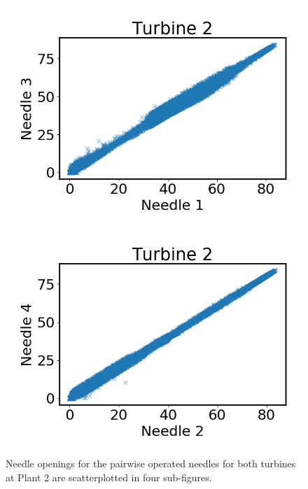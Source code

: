 \begin{figure}
\begin{minipage}[b]{0.5\linewidth}
                \includegraphics[width=\textwidth]{report/figures/data/p2_t2_n1_n3.png}
            \end{minipage}
            \begin{minipage}[b]{0.5\linewidth}
                \centering
                \includegraphics[width=\textwidth]{report/figures/data/p2_t2_n2_n4.png}
            \end{minipage}
            \caption{Needle openings for the pairwise operated needles for both turbines at Plant 2 are scatterplotted in four sub-figures.}
            \label{fig:plant2_needles}
        \end{figure}
        
        
        
